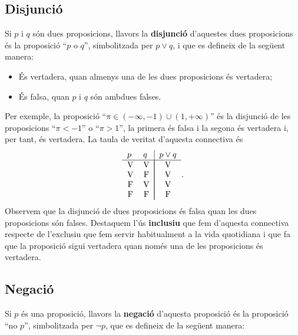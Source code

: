 \subsection{Disjunció}

Si $p$ i $q$ són dues proposicions, llavors la \textbf{disjunció}
d'aquestes dues proposicions és la proposició \enquote{$p$ o $q$},
simbolitzada per $p\vee q$, i que es defineix de la següent manera:

\begin{itemize}
\item És vertadera, quan almenys una de les dues proposicions és
vertadera;

\item És falsa, quan $p$ i $q$ són ambdues falses.
\end{itemize}

Per exemple, la proposició \enquote{$\pi\in\left( -\infty,-1\right) \cup\left(
1,+\infty\right) $} és la disjunció de les proposicions \enquote{$\pi<-1$} o
\enquote{$\pi>1$}, la primera és falsa i la segona és vertadera i, per tant,
és vertadera. La taula de veritat d'aquesta connectiva és\begin{equation*}
\begin{tabular}{ll|l}
$p$ & $q$ & $p\vee q$ \\ \hline
\multicolumn{1}{c}{V} & \multicolumn{1}{c|}{V} & \multicolumn{1}{|c}{V} \\
\multicolumn{1}{c}{V} & \multicolumn{1}{c|}{F} & \multicolumn{1}{|c}{V} \\
\multicolumn{1}{c}{F} & \multicolumn{1}{c|}{V} & \multicolumn{1}{|c}{V} \\
\multicolumn{1}{c}{F} & \multicolumn{1}{c|}{F} & \multicolumn{1}{|c}{F}\end{tabular}
\text{.}
\end{equation*}
Observem que la disjunció de dues proposicions és falsa quan les
dues proposicions són falses. Destaquem l'ús \textbf{inclusiu} que
fem d'aquesta connectiva respecte de l'exclusiu que fem servir habitualment
a la vida quotidiana i que fa que la proposició sigui vertadera quan només una de les proposicions és vertadera.

\subsection{Negació}

Si $p$ és una proposició, llavors la \textbf{negació} d'aquesta
proposició és la proposició \enquote{no $p$}, simbolitzada per $\lnot p$, que es defineix de la següent manera:

